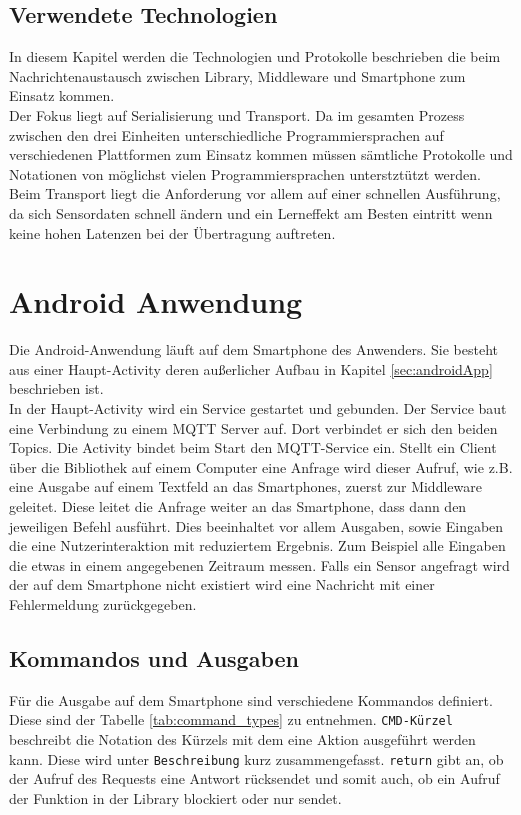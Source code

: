 \documentclass[11pt,a4paper]{report}
\begin{document}
\section{Verwendete Technologien}\label{sec:net_tech}
In diesem Kapitel werden die Technologien und Protokolle beschrieben die beim Nachrichtenaustausch zwischen Library, Middleware und Smartphone zum Einsatz kommen.
\\
Der Fokus liegt auf Serialisierung und Transport.
Da im gesamten Prozess zwischen den drei Einheiten unterschiedliche Programmiersprachen auf verschiedenen Plattformen zum Einsatz kommen müssen sämtliche Protokolle und Notationen von möglichst vielen Programmiersprachen unterstztützt werden.
\\
Beim Transport liegt die Anforderung vor allem auf einer schnellen Ausführung, da sich Sensordaten schnell ändern und ein Lerneffekt am Besten eintritt wenn keine hohen Latenzen bei der Übertragung auftreten.










\chapter{Android Anwendung}\label{chap:app}
Die Android-Anwendung läuft auf dem Smartphone des Anwenders.
Sie besteht aus einer Haupt-Activity deren außerlicher Aufbau in Kapitel \ref{sec:androidApp} beschrieben ist. 
\\
In der Haupt-Activity wird ein Service gestartet und gebunden.
Der Service baut eine Verbindung zu einem MQTT Server auf.
Dort verbindet er sich den beiden Topics. 
Die Activity bindet beim Start den MQTT-Service ein.
Stellt ein Client über die Bibliothek auf einem Computer eine Anfrage wird dieser Aufruf, wie z.B. eine Ausgabe auf einem Textfeld an das Smartphones,  zuerst zur Middleware geleitet.
Diese leitet die Anfrage weiter an das Smartphone, dass dann den jeweiligen Befehl ausführt.
Dies beeinhaltet vor allem Ausgaben, sowie Eingaben die eine Nutzerinteraktion mit reduziertem Ergebnis.
Zum Beispiel alle Eingaben die etwas in einem angegebenen Zeitraum messen.
Falls ein Sensor angefragt wird der auf dem Smartphone nicht existiert wird eine Nachricht mit einer Fehlermeldung zurückgegeben.


\section{Kommandos und Ausgaben}
Für die Ausgabe auf dem Smartphone sind verschiedene Kommandos definiert.
Diese sind der Tabelle \ref{tab:command_types} zu entnehmen.
\texttt{CMD-Kürzel} beschreibt die Notation des Kürzels mit dem eine Aktion ausgeführt werden kann.
Diese wird unter \texttt{Beschreibung} kurz zusammengefasst.
\texttt{return} gibt an, ob der Aufruf des Requests eine Antwort rücksendet und somit auch, ob ein Aufruf der Funktion in der Library blockiert oder nur sendet.
\end{document}
